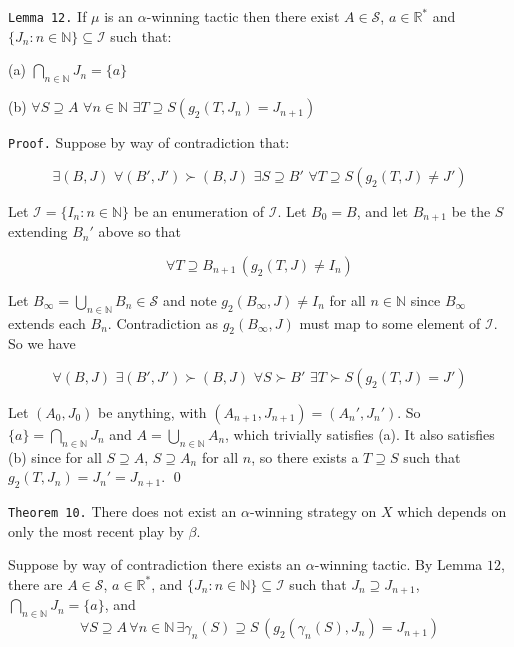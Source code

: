 \documentclass[12pt]{article}
\theoremstyle{plain}
\theoremstyle{definition}
\theoremstyle{remark}
\newcommand{\ds}{\displaystyle}
\begin{document}
\newpage

\texttt{Lemma 12.} If $\mu$ is an $\alpha$-winning tactic then there exist $A \in \mathcal{S}$, $a \in \mathbb{R}^*$ and $\{J_n:n\in\mathbb{N}\}\subseteq \mathcal{I}$ such that:

(a)
$\ds \bigcap_{n\in\mathbb{N}}J_n=\{a\}$

(b)
$\ds \forall S \supseteq A \,\,\forall n \in \mathbb{N} \,\,\exists T \supseteq S (g_2(T,J_n)=J_{n+1})$

\texttt{Proof.} Suppose by way of contradiction that:

\[\exists (B,J) \,\,\forall (B',J')\succ(B,J) \,\,\exists S \supseteq B' \,\,\forall T \supseteq S (g_2(T,J)\not=J')\]

Let $\mathcal{I}=\{I_n : n\in\mathbb{N}\}$ be an enumeration of $\mathcal{I}$. Let $B_0=B$, and let $B_{n+1}$ be the $S$ extending $B_n'$ above so that 

\begin{equation}
\forall T \supseteq B_{n+1} \, (g_2(T,J)\not= I_n)
\end{equation}

Let $B_\infty = \bigcup_{n\in\mathbb{N}} B_n \in \mathcal{S}$ and note $g_2(B_\infty,J)\not= I_n$ for all $n\in\mathbb{N}$ since $B_\infty$ extends each $B_n$. Contradiction as $g_2(B_\infty,J)$ must map to some element of $\mathcal{I}$. So we have

\[\forall (B,J) \,\,\exists (B',J')\succ(B,J) \,\,\forall S \succ B' \,\,\exists T \succ S (g_2(T,J)=J')\]

Let $(A_0,J_0)$ be anything, with $(A_{n+1},J_{n+1}) = (A_n',J_n')$. So $\{a\}=\bigcap_{n\in\mathbb{N}}J_n$ and $A=\bigcup_{n\in\mathbb{N}}A_n$, which trivially satisfies (a). It also satisfies (b) since for all $S\supseteq A$, $S\supseteq A_n$ for all $n$, so there exists a $T \supseteq S$ such that $g_2(T,J_n)=J_n'=J_{n+1}$.  \qed

\newpage

\texttt{Theorem 10.} There does not exist an $\alpha$-winning strategy on $X$ which depends on only the most recent play by $\beta$.

Suppose by way of contradiction there exists an $\alpha$-winning tactic. By Lemma $12$, there are $A \in \mathcal{S}$, $a \in \mathbb{R}^*$, and $\{J_n:n\in\mathbb{N}\}\subseteq \mathcal{I}$ such that $J_n \supseteq J_{n+1}$, $\bigcap_{n\in\mathbb{N}} J_n = \{a\}$, and \[\forall S \supseteq A \, \forall n\in\mathbb{N} \, \exists \gamma_n(S) \supseteq S \, (g_2(\gamma_n(S),J_n)=J_{n+1})\]
\end{document}
